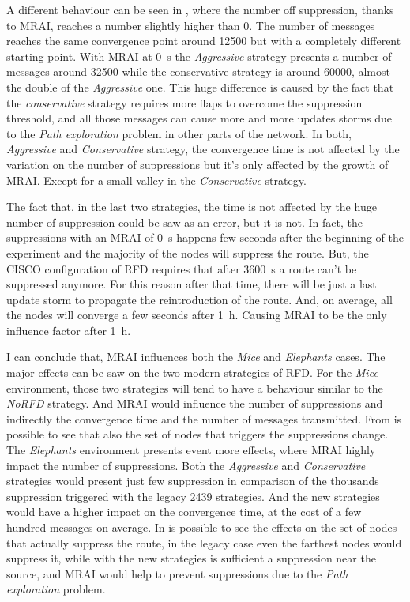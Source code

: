 A different behaviour can be seen in
,
where the number off suppression, thanks to \ac{MRAI}, reaches a number slightly
higher than \num{0}.
The number of messages reaches the same convergence point around \num{12500} but
with a completely different starting point.
With \ac{MRAI} at \SI{0}{\second} the \textit{Aggressive} strategy presents a number of
messages around \num{32500} while the conservative strategy is around \num{60000},
almost the double of the \textit{Aggressive} one.
This huge difference is caused by the fact that the \textit{conservative} strategy requires
more flaps to overcome the suppression threshold, and all those messages can
cause more and more updates storms due to the \textit{Path exploration} problem
in other parts of the network.
In both, \textit{Aggressive} and \textit{Conservative} strategy, the convergence
time is not affected by the variation on the number of suppressions but it's only
affected by the growth of \ac{MRAI}.
Except for a small valley in the \textit{Conservative} strategy.

The fact that, in the last two strategies, the time is not affected by the huge number
of suppression could be saw as an error, but it is not.
In fact, the suppressions with an \ac{MRAI} of \SI{0}{\second} happens
few seconds after the beginning of the experiment and the majority of the nodes
will suppress the route.
But, the CISCO configuration of \ac{RFD} requires that after \SI{3600}{\second} a route
can't be suppressed anymore.
For this reason after that time, there will be just a last update storm to propagate
the reintroduction of the route.
And, on average, all the nodes will converge a few seconds after \SI{1}{\hour}.
Causing \ac{MRAI} to be the only influence factor after \SI{1}{\hour}.

I can conclude that, \ac{MRAI} influences both the \textit{Mice} and
\textit{Elephants} cases.
The major effects can be saw on the two modern strategies of \ac{RFD}.
For the \textit{Mice} environment, those two strategies will tend to have
a behaviour similar to the \textit{NoRFD} strategy. And \ac{MRAI} would
influence the number of suppressions and indirectly the convergence time
and the number of messages transmitted.
From  is possible to see that also the set of
nodes that triggers the suppressions change.
The \textit{Elephants} environment presents event more effects, where
\ac{MRAI} highly impact the number of suppressions.
Both the \textit{Aggressive} and \textit{Conservative} strategies would present
just few suppression in comparison of the thousands suppression triggered with the
legacy \num{2439} strategies.
And the new strategies would have a higher impact on the convergence time, at
the cost of a few hundred messages on average.
In  is possible to see the effects
on the set of nodes that actually suppress the route, in the legacy
case even the farthest nodes would suppress it, while with the new
strategies is sufficient a suppression near the source, and \ac{MRAI} would
help to prevent suppressions due to the \textit{Path exploration} problem.

